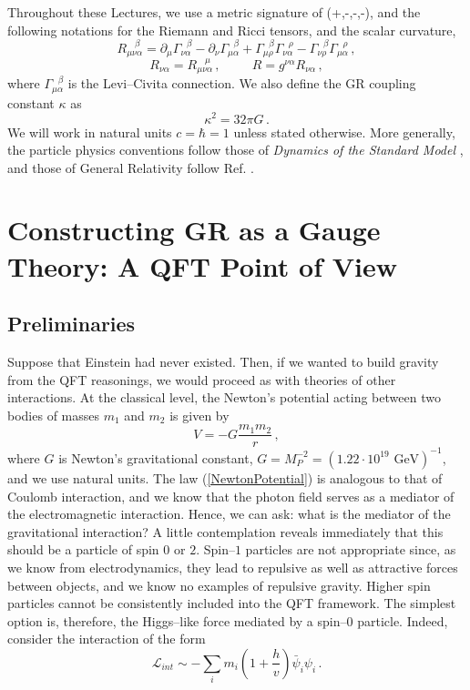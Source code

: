 \documentclass[11pt,a4paper]{article}
\newcommand{\be}{\begin{equation}}
\newcommand{\ee}{\end{equation}}
\begin{document}
Throughout these Lectures, we use a metric signature of (+,-,-,-), and the following notations for the Riemann and Ricci tensors, and the scalar curvature,
\be
R_{\mu\nu\alpha}^{~~~~\beta}=\partial_\mu\Gamma_{\nu\alpha}^{~~~\beta}-\partial_\nu\Gamma_{\mu\alpha}^{~~~\beta}
+\Gamma_{\mu\rho}^{~~~\beta}\Gamma^{~~~\rho}_{\nu\alpha}-\Gamma_{\nu\rho}^{~~~\beta}\Gamma_{\mu\alpha}^{~~~\rho} \,,
\ee
\be
R_{\nu\alpha}=R_{\mu\nu\alpha}^{~~~~\mu}\,,~~~~~~~~~~~R=g^{\nu\alpha}R_{\nu\alpha}\,,
\ee
where $\Gamma_{\mu\alpha}^{~~~\beta}$ is the Levi--Civita connection. We also define the GR coupling constant $\kappa$ as
\be
\kappa^2 = 32\pi G\,.
\ee
We will work in natural units $c=\hbar=1$ unless stated otherwise. More generally, the particle physics conventions follow those of {\it Dynamics
of the Standard Model} \cite{Donoghue:1992dd}, and those of General Relativity follow Ref. \cite{Gasperini}.

\section{Constructing GR as a Gauge Theory: A QFT Point of View}
\label{sec:intro}

\subsection{Preliminaries}

Suppose that Einstein had never existed.
Then, if we wanted to build gravity from the QFT reasonings,
we would proceed as with theories of other interactions.
At the classical level, the Newton's potential acting between two bodies of masses $m_1$ and $m_2$ is given by
\begin{equation}\label{NewtonPotential}
V=-G\dfrac{m_1m_2}{r}\,,
\end{equation}
where $G$ is Newton's gravitational constant, $G=M_P^{-2}=(1.22\cdot 10^{19}\text{ GeV})^{-1}$, and we use natural units. The law (\ref{NewtonPotential}) is analogous to that of Coulomb interaction, and we know that the photon field serves as a mediator of the electromagnetic interaction. Hence, we can ask: what is the mediator of the gravitational interaction? A little contemplation reveals immediately that this should be a particle of spin $0$ or $2$. Spin--$1$ particles are not appropriate since, as we know from electrodynamics, they lead to repulsive as well as attractive forces between objects, and we know no examples of repulsive gravity. Higher spin particles cannot be consistently included into the QFT framework. The simplest option is, therefore, the Higgs--like force mediated by a spin--$0$ particle. Indeed, consider the interaction of the form
\begin{equation}
\mathcal{L}_{int}\sim -\sum_i m_i\left(1+\frac{h}{v}\right)\bar{\psi}_i\psi_i \,.
\end{equation}
\end{document}
